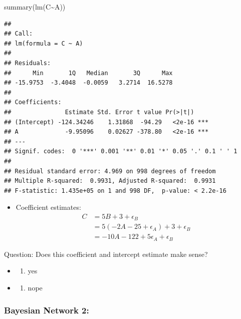 \documentclass[
]{article}
\newenvironment{Shaded}{\begin{snugshade}}{\end{snugshade}}
\newcommand{\FunctionTok}[1]{\textcolor[rgb]{0.00,0.00,0.00}{#1}}
\newcommand{\NormalTok}[1]{#1}
\newcommand{\SpecialCharTok}[1]{\textcolor[rgb]{0.00,0.00,0.00}{#1}}
\providecommand{\tightlist}{%
  \setlength{\itemsep}{0pt}\setlength{\parskip}{0pt}}
\begin{document}
\begin{Shaded}
\begin{Highlighting}[]
\FunctionTok{summary}\NormalTok{(}\FunctionTok{lm}\NormalTok{(C}\SpecialCharTok{\textasciitilde{}}\NormalTok{A))}
\end{Highlighting}
\end{Shaded}

\begin{verbatim}
## 
## Call:
## lm(formula = C ~ A)
## 
## Residuals:
##      Min       1Q   Median       3Q      Max 
## -15.9753  -3.4048  -0.0059   3.2714  16.5278 
## 
## Coefficients:
##               Estimate Std. Error t value Pr(>|t|)    
## (Intercept) -124.34246    1.31868  -94.29   <2e-16 ***
## A             -9.95096    0.02627 -378.80   <2e-16 ***
## ---
## Signif. codes:  0 '***' 0.001 '**' 0.01 '*' 0.05 '.' 0.1 ' ' 1
## 
## Residual standard error: 4.969 on 998 degrees of freedom
## Multiple R-squared:  0.9931, Adjusted R-squared:  0.9931 
## F-statistic: 1.435e+05 on 1 and 998 DF,  p-value: < 2.2e-16
\end{verbatim}

\begin{itemize}
\tightlist
\item
  Coefficient estimates: \[\begin{align}
  C &= 5B + 3 + \epsilon_B \\
  &= 5(-2A - 25 + \epsilon_A) + 3 + \epsilon_B \\
  &= -10A - 122 + 5\epsilon_A + \epsilon_B
  \end{align}\]
\end{itemize}

Question: Does this coefficient and intercept estimate make sense?

\begin{itemize}
\item
  \begin{enumerate}
  \def\labelenumi{\alph{enumi})}
  \tightlist
  \item
    yes
  \end{enumerate}
\item
  \begin{enumerate}
  \def\labelenumi{\alph{enumi})}
  \setcounter{enumi}{1}
  \tightlist
  \item
    nope
  \end{enumerate}
\end{itemize}

\hypertarget{bayesian-network-2}{%
\subsubsection{Bayesian Network 2:}\label{bayesian-network-2}}
\end{document}
